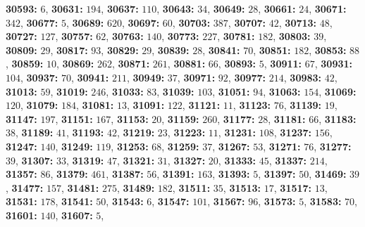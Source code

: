 \textsf{\bfseries 30593:} $6$, \textsf{\bfseries 30631:} $194$, \textsf{\bfseries 30637:} $110$, \textsf{\bfseries 30643:} $34$, \textsf{\bfseries 30649:} $28$, \textsf{\bfseries 30661:} $24$, \textsf{\bfseries 30671:} $342$, \textsf{\bfseries 30677:} $5$, \textsf{\bfseries 30689:} $620$, \textsf{\bfseries 30697:} $60$, \textsf{\bfseries 30703:} $387$, \textsf{\bfseries 30707:} $42$, \textsf{\bfseries 30713:} $48$, \textsf{\bfseries 30727:} $127$, \textsf{\bfseries 30757:} $62$, \textsf{\bfseries 30763:} $140$, \textsf{\bfseries 30773:} $227$, \textsf{\bfseries 30781:} $182$, \textsf{\bfseries 30803:} $39$, \textsf{\bfseries 30809:} $29$, \textsf{\bfseries 30817:} $93$, \textsf{\bfseries 30829:} $29$, \textsf{\bfseries 30839:} $28$, \textsf{\bfseries 30841:} $70$, \textsf{\bfseries 30851:} $182$, \textsf{\bfseries 30853:} $88$, \textsf{\bfseries 30859:} $10$, \textsf{\bfseries 30869:} $262$, \textsf{\bfseries 30871:} $261$, \textsf{\bfseries 30881:} $66$, \textsf{\bfseries 30893:} $5$, \textsf{\bfseries 30911:} $67$, \textsf{\bfseries 30931:} $104$, \textsf{\bfseries 30937:} $70$, \textsf{\bfseries 30941:} $211$, \textsf{\bfseries 30949:} $37$, \textsf{\bfseries 30971:} $92$, \textsf{\bfseries 30977:} $214$, \textsf{\bfseries 30983:} $42$, \textsf{\bfseries 31013:} $59$, \textsf{\bfseries 31019:} $246$, \textsf{\bfseries 31033:} $83$, \textsf{\bfseries 31039:} $103$, \textsf{\bfseries 31051:} $94$, \textsf{\bfseries 31063:} $154$, \textsf{\bfseries 31069:} $120$, \textsf{\bfseries 31079:} $184$, \textsf{\bfseries 31081:} $13$, \textsf{\bfseries 31091:} $122$, \textsf{\bfseries 31121:} $11$, \textsf{\bfseries 31123:} $76$, \textsf{\bfseries 31139:} $19$, \textsf{\bfseries 31147:} $197$, \textsf{\bfseries 31151:} $167$, \textsf{\bfseries 31153:} $20$, \textsf{\bfseries 31159:} $260$, \textsf{\bfseries 31177:} $28$, \textsf{\bfseries 31181:} $66$, \textsf{\bfseries 31183:} $38$, \textsf{\bfseries 31189:} $41$, \textsf{\bfseries 31193:} $42$, \textsf{\bfseries 31219:} $23$, \textsf{\bfseries 31223:} $11$, \textsf{\bfseries 31231:} $108$, \textsf{\bfseries 31237:} $156$, \textsf{\bfseries 31247:} $140$, \textsf{\bfseries 31249:} $119$, \textsf{\bfseries 31253:} $68$, \textsf{\bfseries 31259:} $37$, \textsf{\bfseries 31267:} $53$, \textsf{\bfseries 31271:} $76$, \textsf{\bfseries 31277:} $39$, \textsf{\bfseries 31307:} $33$, \textsf{\bfseries 31319:} $47$, \textsf{\bfseries 31321:} $31$, \textsf{\bfseries 31327:} $20$, \textsf{\bfseries 31333:} $45$, \textsf{\bfseries 31337:} $214$, \textsf{\bfseries 31357:} $86$, \textsf{\bfseries 31379:} $461$, \textsf{\bfseries 31387:} $56$, \textsf{\bfseries 31391:} $163$, \textsf{\bfseries 31393:} $5$, \textsf{\bfseries 31397:} $50$, \textsf{\bfseries 31469:} $39$, \textsf{\bfseries 31477:} $157$, \textsf{\bfseries 31481:} $275$, \textsf{\bfseries 31489:} $182$, \textsf{\bfseries 31511:} $35$, \textsf{\bfseries 31513:} $17$, \textsf{\bfseries 31517:} $13$, \textsf{\bfseries 31531:} $178$, \textsf{\bfseries 31541:} $50$, \textsf{\bfseries 31543:} $6$, \textsf{\bfseries 31547:} $101$, \textsf{\bfseries 31567:} $96$, \textsf{\bfseries 31573:} $5$, \textsf{\bfseries 31583:} $70$, \textsf{\bfseries 31601:} $140$, \textsf{\bfseries 31607:} $5$, 
